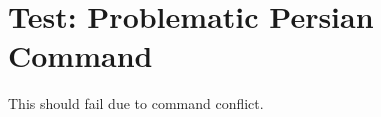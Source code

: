 \documentclass[12pt,a4paper]{article}
\newcommand{\en}[1]{\textenglish{#1}}
\begin{document}
\section*{Test: Problematic Persian Command}

\en{This should fail due to command conflict.}
\end{document}
